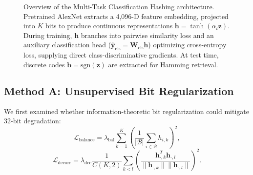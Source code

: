 \documentclass[10pt,conference]{IEEEtran}
\begin{document}
\begin{figure}[!t]
{
}
\caption{Overview of the Multi-Task Classification Hashing architecture. Pretrained AlexNet extracts a 4,096-D feature embedding, projected into $K$ bits to produce continuous representations $\mathbf{h} = \tanh(\alpha_t \mathbf{z})$. During training, $\mathbf{h}$ branches into pairwise similarity loss and an auxiliary classification head ($\hat{\mathbf{y}}_{\text{cls}} = \mathbf{W}_{\text{cls}} \mathbf{h}$) optimizing cross-entropy loss, supplying direct class-discriminative gradients. At test time, discrete codes $\mathbf{b} = \mathrm{sgn}(\mathbf{z})$ are extracted for Hamming retrieval.}
\label{fig:arch}
\end{figure}

\subsection{Method A: Unsupervised Bit Regularization}
We first examined whether information-theoretic bit regularization \cite{shen2015supervised} could mitigate 32-bit degradation:
\begin{equation}
    \mathcal{L}_{\text{balance}} = \lambda_{\text{bal}} \sum_{k=1}^K \left( \frac{1}{|\mathcal{B}|} \sum_{i \in \mathcal{B}} h_{i,k} \right)^2,
\end{equation}
\begin{equation}
    \mathcal{L}_{\text{decorr}} = \lambda_{\text{dec}} \frac{1}{C(K, 2)} \sum_{k < l} \left( \frac{\mathbf{h}_{\cdot, k}^T \mathbf{h}_{\cdot, l}}{\|\mathbf{h}_{\cdot, k}\| \|\mathbf{h}_{\cdot, l}\|} \right)^2.
\end{equation}
\end{document}
